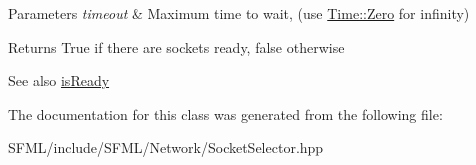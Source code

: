 \begin{DoxyParams}{Parameters}
{\em timeout} & Maximum time to wait, (use \mbox{\hyperlink{classsf_1_1_time_a8db127b632fa8da21550e7282af11fa0}{Time\+::\+Zero}} for infinity)\\
\hline
\end{DoxyParams}
\begin{DoxyReturn}{Returns}
True if there are sockets ready, false otherwise
\end{DoxyReturn}
\begin{DoxySeeAlso}{See also}
\mbox{\hyperlink{classsf_1_1_socket_selector_a917a4bac708290a6782e6686fd3bf889}{is\+Ready}} \begin{DoxyVerb}\end{DoxyVerb}
 
\end{DoxySeeAlso}


The documentation for this class was generated from the following file\+:\begin{DoxyCompactItemize}
\item 
S\+F\+M\+L/include/\+S\+F\+M\+L/\+Network/Socket\+Selector.\+hpp\end{DoxyCompactItemize}
